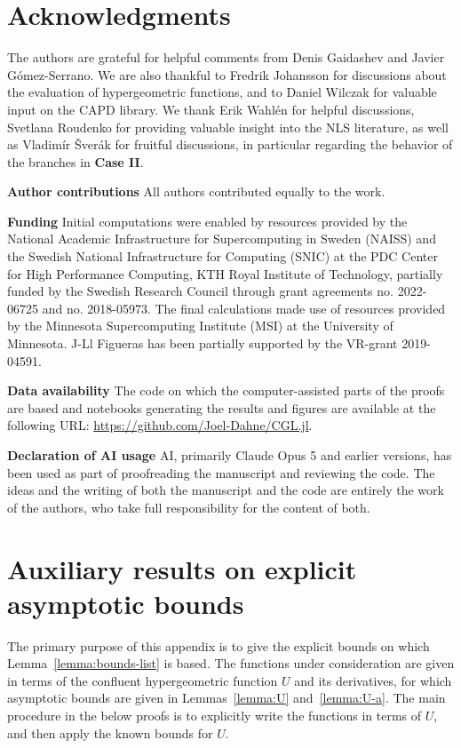 \documentclass[11pt]{article}
\begin{document}
\section*{Acknowledgments}
The authors are grateful for helpful comments from Denis Gaidashev and
Javier Gómez-Serrano. We are also thankful to Fredrik Johansson for
discussions about the evaluation of hypergeometric functions, and to
Daniel Wilczak for valuable input on the CAPD library. We thank Erik
Wahlén for helpful discussions, Svetlana Roudenko for providing
valuable insight into the NLS literature, as well as Vladimír Šverák
for fruitful discussions, in particular regarding the behavior of the
branches in \textbf{Case II}.

\noindent \textbf{Author contributions} All authors contributed
equally to the work.

\medskip

\noindent \textbf{Funding} Initial computations were enabled by
resources provided by the National Academic Infrastructure for
Supercomputing in Sweden (NAISS) and the Swedish National
Infrastructure for Computing (SNIC) at the PDC Center for High
Performance Computing, KTH Royal Institute of Technology, partially
funded by the Swedish Research Council through grant agreements no.
2022-06725 and no. 2018-05973. The final calculations made use of
resources provided by the Minnesota Supercomputing Institute (MSI) at
the University of Minnesota. J-Ll Figueras has been partially
supported by the VR-grant 2019-04591.

\medskip

\noindent \textbf{Data availability} The code on which the
computer-assisted parts of the proofs are based and notebooks
generating the results and figures are available at the following URL:
\url{https://github.com/Joel-Dahne/CGL.jl}.

\medskip

\noindent \textbf{Declaration of AI usage} AI, primarily Claude Opus 5
and earlier versions, has been used as part of proofreading the
manuscript and reviewing the code. The ideas and the writing of both
the manuscript and the code are entirely the work of the authors, who
take full responsibility for the content of both.

\appendix

\section{Auxiliary results on explicit asymptotic bounds}
\label{sec:function-bounds-proofs}
The primary purpose of this appendix is to give the explicit bounds on
which Lemma~\ref{lemma:bounds-list} is based. The functions under
consideration are given in terms of the confluent hypergeometric
function \(U\) and its derivatives, for which asymptotic bounds are
given in Lemmas~\ref{lemma:U} and~\ref{lemma:U-a}. The main procedure
in the below proofs is to explicitly write the functions in terms of
\(U\), and then apply the known bounds for \(U\).
\end{document}
